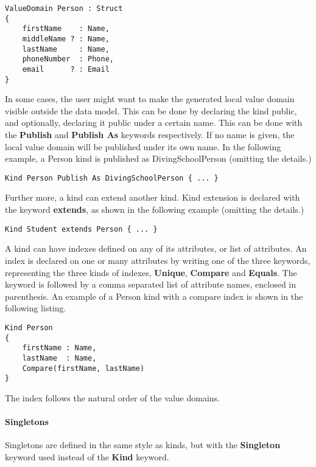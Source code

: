 \begin{lstlisting}[language=edma]
ValueDomain Person : Struct
{
	firstName    : Name,
	middleName ? : Name,
	lastName     : Name,
	phoneNumber  : Phone,
	email      ? : Email
}
\end{lstlisting}

In some cases, the user might want to make the generated local value
domain visible outside the data model. This can be done by declaring
the kind public, and optionally, declaring it public under a certain
name. This can be done with the \textbf{Publish} and \textbf{Publish
As} keywords respectively. If no name is given, the local value domain
will be published under its own name. In the following example, a
Person kind is published as DivingSchoolPerson (omitting the details.)

\begin{lstlisting}[language=edma]
Kind Person Publish As DivingSchoolPerson { ... }
\end{lstlisting}

Further more, a kind can extend another kind. Kind extension is declared
with the keyword \textbf{extends}, as shown in the following example
(omitting the details.)

\begin{lstlisting}[language=edma]
Kind Student extends Person { ... }
\end{lstlisting}

A kind can have indexes defined on any of its attributes, or list
of attributes. An index is declared on one or many attributes by writing
one of the three keywords, representing the three kinds of indexes,
\textbf{Unique}, \textbf{Compare} and \textbf{Equals}. The keyword
is followed by a comma separated list of attribute names, enclosed
in parenthesis. An example of a Person kind with a compare index is
shown in the following listing.

\begin{lstlisting}[language=edma]
Kind Person
{
	firstName : Name,
	lastName  : Name,
	Compare(firstName, lastName)
}
\end{lstlisting}

The index follows the natural order of the value domains.


\paragraph{Singletons}

Singletons are defined in the same style as kinds, but with the \textbf{Singleton}
keyword used instead of the \textbf{Kind} keyword.


